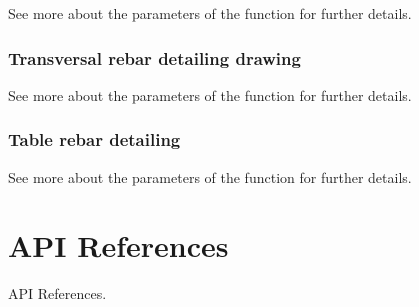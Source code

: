 \documentclass[a4paper,10pt,english]{sphinxmanual}
\begin{document}
\sphinxAtStartPar
See more about the parameters of the {\hyperref[\detokenize{API:etacad.column.Column.draw_longitudinal_rebar_detailing}]{}} function for further details.


\subsection{Transversal rebar detailing drawing}
\label{\detokenize{usage:id2}}
\begin{sphinxVerbatim}[commandchars=\\\{\}]
\end{sphinxVerbatim}

\sphinxAtStartPar
See more about the parameters of the {\hyperref[\detokenize{API:etacad.column.Column.draw_transverse_rebar_detailing}]{}} function for further details.


\subsection{Table rebar detailing}
\label{\detokenize{usage:id3}}
\begin{sphinxVerbatim}[commandchars=\\\{\}]
\end{sphinxVerbatim}

\sphinxAtStartPar
See more about the parameters of the  function for further details.

\sphinxstepscope


\chapter{API References}
\label{\detokenize{API:api-references}}\label{\detokenize{API::doc}}
\sphinxAtStartPar
API References.
\label{\detokenize{API:module-etacad.bar}}
\end{document}
